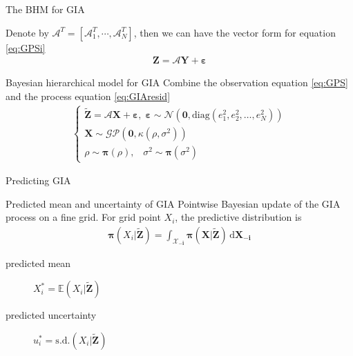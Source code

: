 \documentclass{beamer}
\newcommand{\ud}{\,\mathrm{d}}
\begin{document}
\begin{frame}{The BHM for GIA}

Denote by $\bm{\mathcal{A}}^T = \left[
 \bm{\mathcal{A}}_1^T, \cdots,\bm{\mathcal{A}}_N^T \right]$,
then we can have the vector form for equation \ref{eq:GPSi}
\begin{align}\label{eq:GPS}
\bm{Z} = \bm{\mathcal{A}}\bm{Y} + \bm{\varepsilon} 
\end{align}
\begin{block}{Bayesian hierarchical model for GIA}
Combine the observation equation \ref{eq:GPS} and the process equation \ref{eq:GIAresid}
\begin{align}\label{eq:BHM}
\left\{ \begin{array}{l}
\bm{\tilde{Z}} = \bm{\mathcal{A}}\bm{X} + \bm{\varepsilon}, \; 
\bm{\varepsilon} \sim \mathcal{N} (\bm{0}, \mbox{diag}(e_1^2, e_2^2, \dots, e_N^2)) \\
\bm{X} \sim \mathcal{GP}(\bm{0}, \kappa(\rho, \sigma^2)) \\
\rho \sim \bm{\pi}(\rho), \;\;\; \sigma^2 \sim \bm{\pi}(\sigma^2)
\end{array} \right.
\end{align}
\end{block}

\end{frame}

\begin{frame}{Predicting GIA}
\begin{block}{Predicted mean and uncertainty of GIA}
Pointwise Bayesian update of the GIA process on a fine grid. For grid point $X_i$, the predictive distribution is
\begin{align}
\bm{\pi}(X_i | \bm{\tilde{Z}}) = \int_{\bm{\mathcal{X}_{-i}}} \bm{\pi}(\bm{X} | \bm{\tilde{Z}}) \ud \bm{X_{-i}}
\end{align}
\begin{description}
\item[predicted mean] $X_i^* = \mathbb{E}(X_i| \bm{\tilde{Z}})$
\item[predicted uncertainty] $u_i^* = \mbox{s.d.}(X_i| \bm{\tilde{Z}})$
\end{description}

\end{block}
\end{frame}

\end{document}

